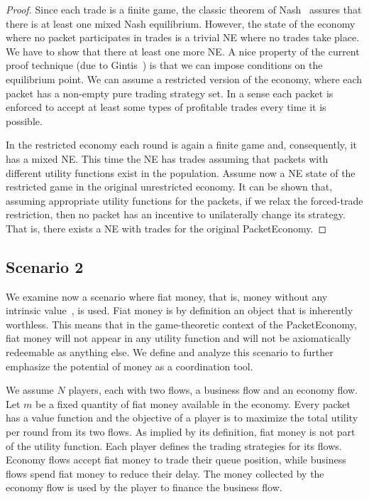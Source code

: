 \documentclass[letterpaper,10pt]{llncs}
\newcommand{\hla}[1]{\hl{#1}}
\renewcommand{\hla}[1]{#1}
\begin{document}
\begin{proof}
Since each trade is a finite game, the classic theorem of Nash~\cite{Nash:1950:Equilibrium,Nash:1951:NCG} assures that there is at least one mixed Nash equilibrium. However, the state of the economy where no packet participates in trades is a trivial
NE where no trades take place. We have to show that there at least one more NE.
A nice property of the current proof technique (due to Gintis~\cite{Gi97}) is that we can impose conditions on the 
equilibrium point. We can assume a restricted version of the economy, where each packet has a non-empty pure trading strategy set. In a sense each packet is enforced to accept at least some types of profitable trades every time it is possible. 

In the restricted economy each round is again a finite game and, consequently, it has a mixed NE. This time the NE has trades assuming that packets with different utility functions exist in the population. Assume now a NE state of the restricted game in the original unrestricted economy. 
\hla{It can be shown that,} assuming appropriate utility functions for the packets, 
if we relax the forced-trade restriction, then no packet has an incentive to 
unilaterally change its strategy.
That is, there exists a NE with trades for the original PacketEconomy.
\end{proof}

\subsection{Scenario 2}
\label{sec:ScenarioFiat}
We examine now a scenario where fiat money, that is, money without any intrinsic value~\cite{Mankiw:2008:Economics}, is used. Fiat money is by definition an object that 
is inherently worthless. This means that in the game-theoretic context of the PacketEconomy,
fiat money will not appear in any utility function and will not be axiomatically redeemable as anything else. We define and analyze this scenario to further emphasize the potential of money as a coordination tool.

We assume $N$ players, each with two flows, a business flow and an economy flow.
Let $m$ be a fixed quantity of fiat money available in the economy. Every packet has 
a value function and the objective of a player is to maximize the total utility
per round from its two flows. As implied by its definition, fiat money is not part of the utility
function.
Each player defines the trading strategies for its flows. Economy flows accept fiat
money to trade their queue position, while business flows spend fiat money to reduce their
delay. The money collected by the economy flow is used by the player to finance the  
business flow.
\end{document}
